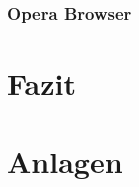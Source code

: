 \documentclass[12pt]{article}
\begin{document}
\subsubsection{Opera Browser}




 \section{Fazit}


\newpage
 \listoffigures
\newpage



\newpage

\centering
\vspace*{200pt}
\Huge{\section{Anlagen}}
\end{document}
